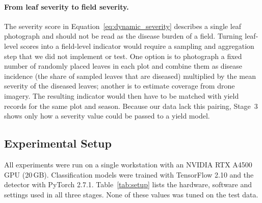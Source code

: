 \paragraph{From leaf severity to field severity.} The severity score in Equation~\ref{eq:dynamic_severity} describes a single leaf photograph and should not be read as the disease burden of a field. Turning leaf-level scores into a field-level indicator would require a sampling and aggregation step that we did not implement or test. One option is to photograph a fixed number of randomly placed leaves in each plot and combine them as disease incidence (the share of sampled leaves that are diseased) multiplied by the mean severity of the diseased leaves; another is to estimate coverage from drone imagery. The resulting indicator would then have to be matched with yield records for the same plot and season. Because our data lack this pairing, Stage~3 shows only how a severity value could be passed to a yield model.

\subsection{Experimental Setup}
\label{sec:setup}
All experiments were run on a single workstation with an NVIDIA RTX A4500 GPU (20\,GB). Classification models were trained with TensorFlow 2.10 and the detector with PyTorch 2.7.1. Table~\ref{tab:setup} lists the hardware, software and settings used in all three stages. None of these values was tuned on the test data.

